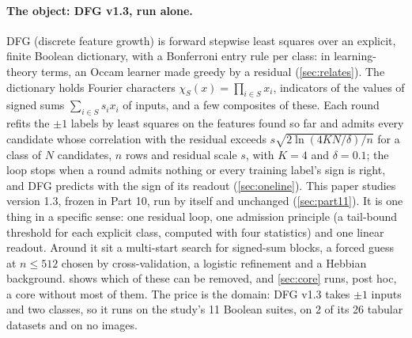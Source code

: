 \paragraph{The object: DFG v1.3, run alone.} DFG (discrete feature growth) is forward stepwise least squares over an explicit, finite Boolean dictionary, with a Bonferroni entry rule per class: in learning-theory terms, an Occam learner made greedy by a residual (\cref{sec:relates}). The dictionary holds Fourier characters $\chi_S(x)=\prod_{i\in S}x_i$, indicators of the values of signed sums $\sum_{i\in S}s_ix_i$ of inputs, and a few composites of these. Each round refits the $\pm1$ labels by least squares on the features found so far and admits every candidate whose correlation with the residual exceeds $s\sqrt{2\ln(4KN/\delta)/n}$ for a class of $N$ candidates, $n$ rows and residual scale $s$, with $K=4$ and $\delta=0.1$; the loop stops when a round admits nothing or every training label's sign is right, and DFG predicts with the sign of its readout (\cref{sec:oneline}). This paper studies version 1.3, frozen in Part 10, run by itself and unchanged (\cref{sec:part11}). It is one thing in a specific sense: one residual loop, one admission principle (a tail-bound threshold for each explicit class, computed with four statistics) and one linear readout. Around it sit a multi-start search for signed-sum blocks, a forced guess at $n\le512$ chosen by cross-validation, a logistic refinement and a Hebbian background.  shows which of these can be removed, and \cref{sec:core} runs, post hoc, a core without most of them. The price is the domain: DFG v1.3 takes $\pm1$ inputs and two classes, so it runs on the study's 11 Boolean suites, on 2 of its 26 tabular datasets and on no images.

